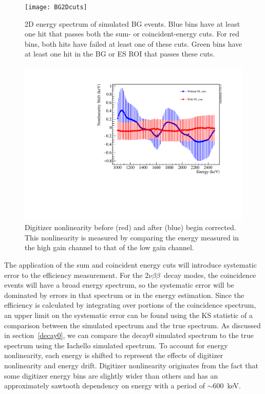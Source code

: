 \documentclass[notitlepage,rmp,aps,10pt]{revtex4-1}
\newcommand{\tnbb}{${2 \nu \beta \beta}$}
\begin{document}
\begin{figure}[h]
  \centering
  \texttt{[image: BG2Dcuts]}
  \caption[2D energy spectrum of simulated BG events]{\label{fig:2Dcuts}
    2D energy spectrum of simulated BG events. Blue bins have at least one hit that passes both the sum- or coincident-energy cuts. For red bins, both hits have failed at least one of these cuts. Green bins have at least one hit in the BG or ES ROI that passes these cuts.
    }
\end{figure}

\begin{figure}[h]
  \centering
  \includegraphics[width=0.8\linewidth]{DigitizerNonlinearity}
  \caption[Measured Digitizer Nonlinearity vs Energy]{\label{fig:dignonlin}
    Digitizer nonlinearity before (red) and after (blue) begin corrected. This nonlinearity is measured by comparing the energy measured in the high gain channel to that of the low gain channel.
  }
\end{figure}
The application of the sum and coincident energy cuts will introduce systematic error to the efficiency measurement.
For the \tnbb\ decay modes, the coincidence events will have a broad energy spectrum, so the systematic error will be dominated by errors in that spectrum or in the energy estimation.
Since the efficiency is calculated by integrating over portions of the coincidence spectrum, an upper limit on the systematic error can be found using the KS statistic of a comparison between the simulated spectrum and the true spectrum.
As discussed in section~\ref{decay0}, we can compare the decay0 simulated spectrum to the true spectrum using the Iachello simulated spectrum.
To account for energy nonlinearity, each energy is shifted to represent the effects of digitizer nonlinearity and energy drift.
Digitizer nonlinearity originates from the fact that some digitizer energy bins are slightly wider than others and has an approximately sawtooth dependency on energy with a period of $\sim600$~keV.
\end{document}
